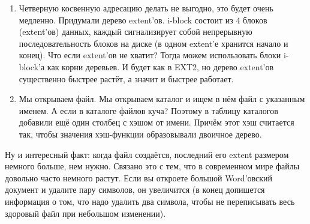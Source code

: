 \documentclass{article}
\begin{document}
\begin{enumerate}
\begin{enumerate}
            \item Четверную косвенную адресацию делать не выгодно, это будет очень медленно. Придумали дерево extent'ов. i-block состоит из 4 блоков (extent'ов) данных, каждый сигнализирует собой непрерывную последовательность блоков на диске (в одном extent'е хранится начало и конец). Что если extent'ов не хватит? Тогда можем использовать блоки i-block'а как корни деревьев. И будет как в EXT2, но дерево extent'ов существенно быстрее растёт, а значит и быстрее работает.
            \item Мы открываем файл. Мы открываем каталог и ищем в нём файл с указанным именем. А если в каталоге файлов куча? Поэтому в таблицу каталогов добавили ещё один столбец с хэшом от имени. Причём этот хэш считается так, чтобы значения хэш-функции образовывали двоичное дерево.
        \end{enumerate}
        Ну и интересный факт: когда файл создаётся, последний его extent размером немного больше, нем нужно. Связано это с тем, что в современном мире файлы довольно часто немного растут. Если вы откроете большой Word'овский документ и удалите пару символов, он увеличится (в конец допишется информация о том, что надо удалить два символа, чтобы не переписывать весь здоровый файл при небольшом изменении).
    \end{enumerate}
\end{document}
